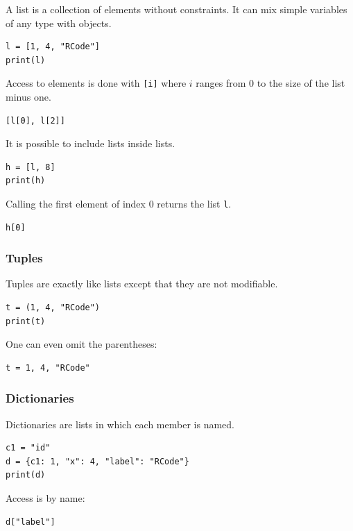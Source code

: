 \documentclass[11pt]{article}
\begin{document}
A list is a collection of elements without constraints. It can mix simple variables of any type with objects.

\begin{lstlisting}
l = [1, 4, "RCode"]
print(l)
\end{lstlisting}

Access to elements is done with \texttt{[i]} where $i$ ranges from $0$ to the size of the list minus one.

\begin{lstlisting}
[l[0], l[2]]
\end{lstlisting}

It is possible to include lists inside lists.

\begin{lstlisting}
h = [l, 8]
print(h)
\end{lstlisting}

Calling the first element of index $0$ returns the list \texttt{l}.

\begin{lstlisting}
h[0]
\end{lstlisting}

\subsubsection{Tuples}

Tuples are exactly like lists except that they are not modifiable.

\begin{lstlisting}
t = (1, 4, "RCode")
print(t)
\end{lstlisting}

One can even omit the parentheses:
\begin{lstlisting}
t = 1, 4, "RCode"
\end{lstlisting}

\subsubsection{Dictionaries}

Dictionaries are lists in which each member is named.

\begin{lstlisting}
c1 = "id"
d = {c1: 1, "x": 4, "label": "RCode"}
print(d)
\end{lstlisting}

Access is by name:
\begin{lstlisting}
d["label"]
\end{lstlisting}
\end{document}
